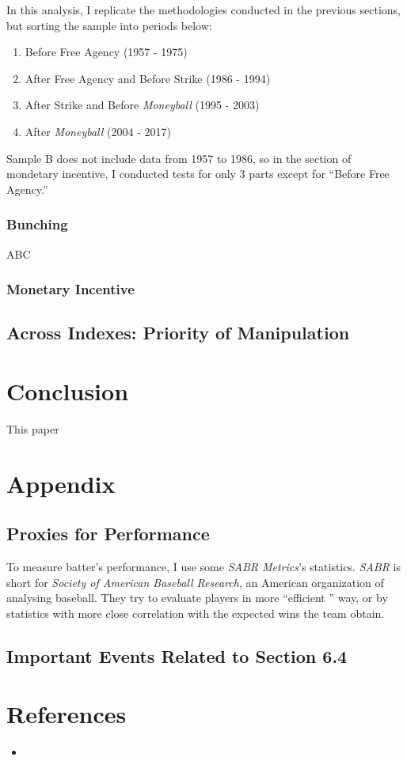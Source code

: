 \documentclass[dvipdfmx, 12pt]{article}
\begin{document}
In this analysis, I replicate the methodologies conducted in the previous sections, but sorting the sample into periods below:

\begin{enumerate}
  \item Before Free Agency (1957 - 1975)

  \item After Free Agency and Before Strike (1986 - 1994)

  \item After Strike and Before \textit{Moneyball} (1995 - 2003)

  \item After \textit{Moneyball} (2004 - 2017)
\end{enumerate}

Sample B does not include data from 1957 to 1986, so in the section of mondetary incentive, I conducted tests for only 3 parts except for ``Before Free Agency.''

\subsubsection{Bunching}

ABC

\subsubsection{Monetary Incentive}



\subsection{Across Indexes: Priority of Manipulation}

\section{Conclusion}

This paper

\section{Appendix}

\subsection{Proxies for Performance}
\small

To measure batter's performance, I use some \textit{SABR Metrics}'s statistics. \textit{SABR} is short for \textit{Society of American Baseball Research}, an American organization of analysing baseball. They try to evaluate players in more ``efficient '' way,  or by statistics with more close correlation with the expected wins the team obtain.

\subsection{Important Events Related to Section 6.4}


\section{References}
\small
\begin{itemize}
  \item
\end{itemize}
\end{document}
